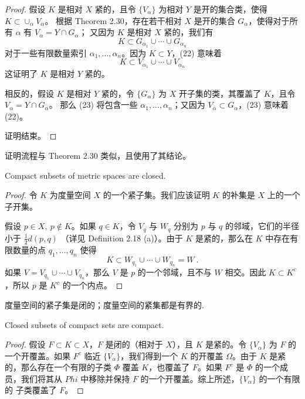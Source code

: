 \documentclass[../poma-notes.tex]{subfiles}
\begin{document}
\begin{proof}
  假设 $K$ 是相对 $X$ 紧的，且令 $\{V_{\alpha}\}$ 为相对 $Y$ 是开的集合类，使得 $K \subset \cup_{\alpha} V_{\alpha}$。
  根据 Theorem 2.30，存在若干相对 $X$ 是开的集合 $G_{\alpha}$，使得对于所有 $\alpha$ 有 $V_{\alpha} = Y \cap G_{\alpha}$；
  又因为 $K$ 是相对 $X$ 紧的，我们有
  \begin{equation}
    K \subset G_{\alpha_1} \cup \cdots \cup G_{\alpha_n}
  \end{equation}
  对于一些有限数量索引 $\alpha_1, \dots, \alpha_n$。因为 $K \subset Y$，(22) 意味着
  \begin{equation}
    K \subset V_{\alpha_1} \cup \cdots \cup V_{\alpha_n}
  \end{equation}
  这证明了 $K$ 是相对 $Y$ 紧的。

  相反的，假设 $K$ 是相对 $Y$ 紧的，令 $\{G_{\alpha}\}$ 为 $X$ 开子集的类，其覆盖了 $K$，且令 $V_{\alpha}=Y\cap G_{\alpha}$。
  那么 (23) 将包含一些 $\alpha_1, \dots, \alpha_n$；又因为 $V_{\alpha} \subset G_{\alpha}$，(23) 意味着 (22)。

  证明结束。
\end{proof}

\anote 证明流程与 Theorem 2.30 类似，且使用了其结论。

\begin{theorem}
  Compact subsets of metric spaces are closed.
\end{theorem}

\begin{proof}
  令 $K$ 为度量空间 $X$ 的一个紧子集。我们应该证明 $K$ 的补集是 $X$ 上的一个子开集。

  假设 $p \in X,\ p \notin K$。如果 $q \in K$，令 $V_q$ 与 $W_q$ 分别为 $p$ 与 $q$ 的邻域，它们的半径小于 $\frac{1}{2}d(p,q)$
  （详见 Definition 2.18 (a)）。由于 $K$ 是紧的，那么在 $K$ 中存在有限数量的点 $q_1,\dots,q_n$ 使得
  \[K \subset W_{q_1} \cup \cdots \cup W_{q_n} = W\ .\]
  如果 $V = V_{q_1} \cup \cdots \cup V_{q_n}$，那么 $V$ 是 $p$ 的一个邻域，且不与 $W$ 相交。因此 $K \subset K^c$，所以 $p$ 是
  $K^c$ 的一个内点。
\end{proof}

\anote 度量空间的紧子集是闭的；度量空间的紧集都是有界的.

\begin{theorem}
  Closed subsets of compact sets are compact.
\end{theorem}

\begin{proof}
  假设 $F \subset K \subset X$，$F$ 是闭的（相对于 $X$），且 $K$ 是紧的。令 $\{V_{\alpha}\}$ 为 $F$ 的一个开覆盖。如果 $F^c$
  临近 $\{V_{\alpha}\}$，我们得到一个 $K$ 的开覆盖 $\Omega$。由于 $K$ 是紧的，那么存在一个有限的子类 $\Phi$ 覆盖 $K$，也覆盖了
  $F$。如果 $F^c$ 是 $\Phi$ 的一个成员，我们将其从 $Phi$ 中移除并保持 $F$ 的一个开覆盖。综上所述，$\{V_{\alpha}\}$ 的一个有限的
  子类覆盖了 $F$。
\end{proof}
\end{document}
